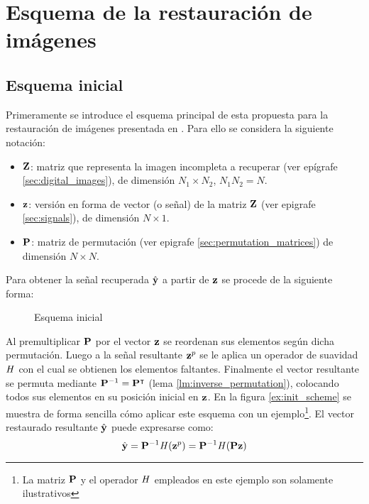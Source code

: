 \chapter{Esquema de la restauraci\'on de im\'agenes}\label{chapter:scheme}

\section{Esquema inicial}
Primeramente se introduce el esquema principal de esta propuesta para la restauraci\'on de im\'agenes presentada en \cite{ram2013image}. Para ello se considera la siguiente notaci\'on:
\begin{itemize}
	\item $\Z$: matriz que representa la imagen incompleta a recuperar (ver epígrafe \ref{sec:digital_images}), de dimensi\'on $N_1 \times N_2$, $N_1N_2 = N$.
	\item $\z$: versión en forma de vector (o señal) de la matriz $\Z$ (ver epigrafe \ref{sec:signals}), de dimensi\'on $N \times 1$.
	\item $\P$: matriz de permutaci\'on (ver epigrafe \ref{sec:permutation_matrices}) de dimensi\'on $N \times N$.
\end{itemize}
Para obtener la señal recuperada $\yhat$ a partir de $\z$ se procede de la siguiente forma:
\begin{figure}[H]
	\centering
	\caption{Esquema inicial}
	\label{fig:init_scheme}
\end{figure}
Al premultiplicar $\P$ por el vector $\z$ se reordenan sus elementos seg\'un dicha permutaci\'on. Luego a la señal resultante $\z^p$ se le aplica un operador de suavidad $\H$ con el cual se obtienen los elementos faltantes. Finalmente el vector resultante se permuta mediante $\P^{-1}=\P^\intercal$ (lema \ref{lm:inverse_permutation}), colocando todos sus elementos en su posici\'on inicial en $\z$. En la figura \ref{ex:init_scheme} se muestra de forma sencilla c\'omo aplicar este esquema con un ejemplo\footnote{La matriz $\P$ y el operador $\H$ empleados en este ejemplo son solamente ilustrativos}. El vector restaurado resultante $\yhat$ puede expresarse como:
\begin{equation}
	\yhat = \P^{-1}\H(\z^p) = \P^{-1}\H(\P\z)
	\label{eq:init_yhat}
\end{equation}

